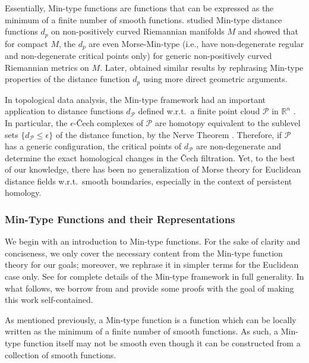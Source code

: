\documentclass[11pt]{article}
\newcommand{\R}{\mathbb{R}}
\newcommand{\eps}{\epsilon}
\theoremstyle{plain}
\theoremstyle{definition}
\theoremstyle{remark}
\begin{document}
Essentially, Min-type functions are functions that can be expressed as the minimum of a finite number of smooth functions.
\cite{gershkovich_morse_1997} studied Min-type distance functions $d_p$ on non-positively curved Riemannian manifolds $M$ and showed that for compact $M$, the $d_p$ are even Morse-Min-type (i.e., have non-degenerate regular and non-degenerate critical points only) for generic non-positively curved Riemannian metrics on $M$.
Later, \cite{itoh_cut_2007} obtained similar results by rephrasing Min-type properties of the distance function $d_p$ using more direct geometric arguments.
 
In topological data analysis, the Min-type framework had an important application to distance functions $d_{\mathcal{P}}$ defined w.r.t.~a finite point cloud $\mathcal{P}$ in  $\R^n$ \citep{bobrowski_distance_2014}. In particular,
the $\eps$-\v{C}ech complexes of $\mathcal{P}$ are homotopy equivalent to the sublevel sets $\{d_{\mathcal{P}} \leq \eps \}$ of the distance function, by the Nerve Theorem \citep{borsuk_imbedding_1948}. Therefore, if $\mathcal{P}$ has a generic configuration, the critical points of $d_{\mathcal{P}}$ are non-degenerate and determine the exact homological changes in the \v{C}ech filtration.
Yet, to the best of our knowledge, there has been no generalization of Morse theory for Euclidean distance fields w.r.t.~smooth boundaries, especially in the context of persistent homology.


\subsubsection{Min-Type Functions and their Representations}

We begin with an introduction to Min-type functions. For the sake of clarity and conciseness, we only cover the necessary content from the Min-type function theory for our goals; moreover, we rephrase it in simpler terms for the Euclidean case only. See \citep{gershkovich_morse_1997} for complete details of the Min-type framework in full generality.  In what follows, we borrow from \citep{gershkovich_morse_1997} and provide some proofs with the goal of making this work self-contained.

As mentioned previously, a Min-type function is a function which can be locally written as the minimum of a finite number of smooth functions. As such, a Min-type function itself may not be smooth even though it can be constructed from a collection of smooth functions. 
\end{document}
